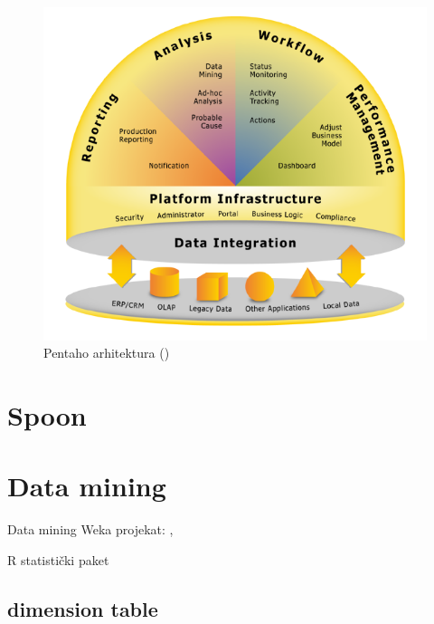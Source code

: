 \documentclass[times, utf8, seminar]{fit}
\begin{document}
\begin{figure}[H]
\centering
\includegraphics[width=15cm]{img/pentaho_arhitektura_eric.png}
\caption{Pentaho arhitektura (\cite{web:eric})}
\end{figure}



\section{Spoon}



\section{Data mining}

Data mining Weka projekat: \cite{web:weka}, \cite{web:pentaho_weka}

R statistički paket \cite{web:r}

\subsection{dimension table}
\end{document}
